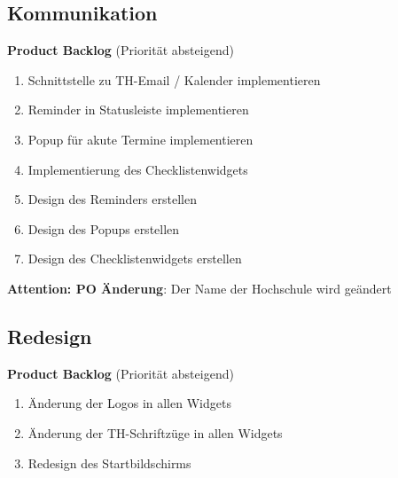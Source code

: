 \documentclass[12pt]{scrartcl}
\begin{document}
\subsection{Kommunikation}
\textbf{Product Backlog} (Priorität absteigend)
\begin{enumerate}
	\item Schnittstelle zu TH-Email / Kalender implementieren
	\item Reminder in Statusleiste implementieren
	\item Popup für akute Termine implementieren 
	\item Implementierung des Checklistenwidgets
	\item Design des Reminders erstellen
	\item Design des Popups erstellen
	\item Design des Checklistenwidgets erstellen 
\end{enumerate}
\textbf{Attention: PO Änderung}: Der Name der Hochschule wird geändert
\subsection{Redesign}
\textbf{Product Backlog} (Priorität absteigend)
\begin{enumerate}
	\item Änderung der Logos in allen Widgets
	\item Änderung der TH-Schriftzüge in allen Widgets
	\item Redesign des Startbildschirms 
\end{enumerate}
\end{document}
